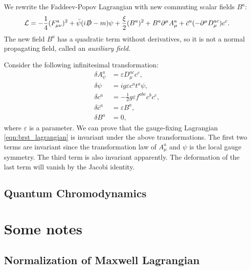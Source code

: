 \documentclass[a4paper,pdftex]{article}
\begin{document}
We rewrite the Faddeev-Popov Lagrangian with new commuting scalar fields $B^{a}$:
\begin{equation}
  \mathcal{L}
  =
  -\frac{1}{4}
  (F_{\mu\nu}^{a})^2
  +
  \bar{\psi}(i\slashed{D}-m)\psi
  +
  \frac{\xi}{2}(B^{a})^2
  +
  B^{a}\partial^{\mu}A_{\mu}^{a}
  +
  \bar{c}^{a}(-\partial^{\mu}D_{\mu}^{ac})c^{c}
  .
  \label{eqn:brst_lagrangian}
\end{equation}
The new field $B^{a}$ has a quadratic term without derivatives, so it is not a normal propagating field, called an \textit{auxiliary field}. 

Consider the following infinitesimal transformation:
\begin{align}
  \delta A_{\psi}^{a}
  &=
  \varepsilon D_{\mu}^{ac}c^{c}
  ,
  \\
  \delta\psi
  &=
  ig\varepsilon c^{a}t^{a}\psi
  ,
  \\
  \delta c^{a}
  &=
  -
  \frac{1}{2}g\varepsilon f^{abc}c^{b}c^{c}
  ,
  \\
  \delta \bar{c}^{a}
  &=
  \varepsilon B^{a}
  ,
  \\
  \delta B^{a}
  &=
  0
  ,
\end{align}
where $\varepsilon$ is a parameter. We can prove that the gauge-fixing Lagrangian \eqref{eqn:brst_lagrangian} is invariant under the above transformations. The first two terms are invariant since the transformation law of $A_{\mu}^{a}$ and $\psi$ is the local gauge symmetry. The third term is also invariant apparently. The deformation of the last term will vanish by the Jacobi identity.








\subsection{Quantum Chromodynamics}








\clearpage
\appendix
\section{Some notes}

\subsection{Normalization of Maxwell Lagrangian}
\end{document}
